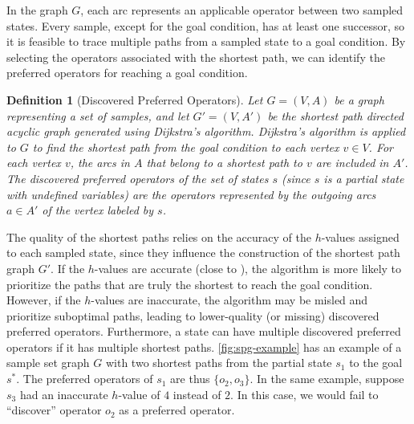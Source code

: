\documentclass[ppgc,diss,english]{iiufrgs}
\newtheorem{definition}{Definition}
\begin{document}
In the graph $G$, each arc represents an applicable operator between two sampled states. Every sample, except for the goal condition, has at least one successor, so it is feasible to trace multiple paths from a sampled state to a goal condition. By selecting the operators associated with the shortest path, we can identify the preferred operators for reaching a goal condition.

\begin{definition}[Discovered Preferred Operators]\label{def:discovered_preferred_operators}
Let $G = (V, A)$ be a graph representing a set of samples, and let $G' = (V, A')$ be the shortest path directed acyclic graph generated using Dijkstra's algorithm. Dijkstra's algorithm is applied to $G$ to find the shortest path from the goal condition to each vertex $v \in V$. For each vertex $v$, the arcs in $A$ that belong to a shortest path to $v$ are included in $A'$. The discovered preferred operators of the set of states $s$ (since $s$ is a partial state with undefined variables) are the operators represented by the outgoing arcs $a \in A'$ of the vertex labeled by $s$.
\end{definition}

The quality of the shortest paths relies on the accuracy of the $h$-values assigned to each sampled state, since they influence the construction of the shortest path graph $G'$. If the $h$-values are accurate (close to \hstar), the algorithm is more likely to prioritize the paths that are truly the shortest to reach the goal condition. However, if the $h$-values are inaccurate, the algorithm may be misled and prioritize suboptimal paths, leading to lower-quality (or missing) discovered preferred operators.
Furthermore, a state can have multiple discovered preferred operators if it has multiple shortest paths. \cref{fig:spg-example} has an example of a sample set graph $G$ with two shortest paths from the partial state $s_{1}$ to the goal $s^{*}$. The preferred operators of $s_{1}$ are thus $\{o_{2}, o_{3}\}$. In the same example, suppose $s_{3}$ had an inaccurate $h$-value of $4$ instead of $2$. In this case, we would fail to ``discover'' operator $o_{2}$ as a preferred operator.
\end{document}
